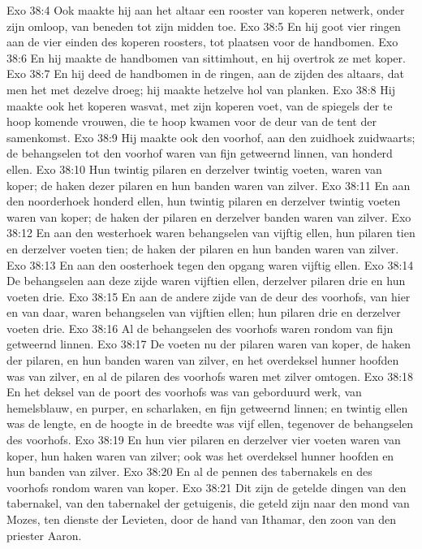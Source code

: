 Exo 38:4  Ook maakte hij aan het altaar een rooster van koperen netwerk, onder zijn omloop, van beneden tot zijn midden toe.
Exo 38:5  En hij goot vier ringen aan de vier einden des koperen roosters, tot plaatsen voor de handbomen.
Exo 38:6  En hij maakte de handbomen van sittimhout, en hij overtrok ze met koper.
Exo 38:7  En hij deed de handbomen in de ringen, aan de zijden des altaars, dat men het met dezelve droeg; hij maakte hetzelve hol van planken.
Exo 38:8  Hij maakte ook het koperen wasvat, met zijn koperen voet, van de spiegels der te hoop komende vrouwen, die te hoop kwamen voor de deur van de tent der samenkomst.
Exo 38:9  Hij maakte ook den voorhof, aan den zuidhoek zuidwaarts; de behangselen tot den voorhof waren van fijn getweernd linnen, van honderd ellen.
Exo 38:10  Hun twintig pilaren en derzelver twintig voeten, waren van koper; de haken dezer pilaren en hun banden waren van zilver.
Exo 38:11  En aan den noorderhoek honderd ellen, hun twintig pilaren en derzelver twintig voeten waren van koper; de haken der pilaren en derzelver banden waren van zilver.
Exo 38:12  En aan den westerhoek waren behangselen van vijftig ellen, hun pilaren tien en derzelver voeten tien; de haken der pilaren en hun banden waren van zilver.
Exo 38:13  En aan den oosterhoek tegen den opgang waren vijftig ellen.
Exo 38:14  De behangselen aan deze zijde waren vijftien ellen, derzelver pilaren drie en hun voeten drie.
Exo 38:15  En aan de andere zijde van de deur des voorhofs, van hier en van daar, waren behangselen van vijftien ellen; hun pilaren drie en derzelver voeten drie.
Exo 38:16  Al de behangselen des voorhofs waren rondom van fijn getweernd linnen.
Exo 38:17  De voeten nu der pilaren waren van koper, de haken der pilaren, en hun banden waren van zilver, en het overdeksel hunner hoofden was van zilver, en al de pilaren des voorhofs waren met zilver omtogen.
Exo 38:18  En het deksel van de poort des voorhofs was van geborduurd werk, van hemelsblauw, en purper, en scharlaken, en fijn getweernd linnen; en twintig ellen was de lengte, en de hoogte in de breedte was vijf ellen, tegenover de behangselen des voorhofs.
Exo 38:19  En hun vier pilaren en derzelver vier voeten waren van koper, hun haken waren van zilver; ook was het overdeksel hunner hoofden en hun banden van zilver.
Exo 38:20  En al de pennen des tabernakels en des voorhofs rondom waren van koper.
Exo 38:21  Dit zijn de getelde dingen van den tabernakel, van den tabernakel der getuigenis, die geteld zijn naar den mond van Mozes, ten dienste der Levieten, door de hand van Ithamar, den zoon van den priester Aaron.
